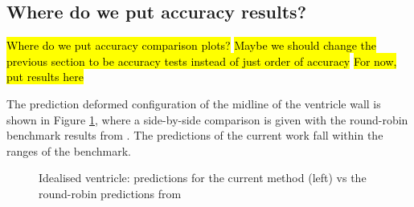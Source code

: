 \documentclass[sn-mathphys,Numbered]{sn-jnl}%
\begin{document}
\subsection{Where do we put accuracy results?}
\hl{Where do we put accuracy comparison plots?}
\hl{Maybe we should change the previous section to be accuracy tests instead of just order of accuracy}
\hl{For now, put results here}

The prediction deformed configuration of the midline of the ventricle wall is shown in Figure \ref{fig:ventricle_accuracy}, where a side-by-side comparison is given with the round-robin benchmark results from \citet{Land2015}.
The predictions of the current work fall within the ranges of the benchmark.
\begin{figure}[htbp]
	\centering
	\caption{Idealised ventricle: predictions for the current method (left) vs the round-robin predictions from \citet{Land2015}}
	\label{fig:ventricle_accuracy}
\end{figure}
\end{document}
